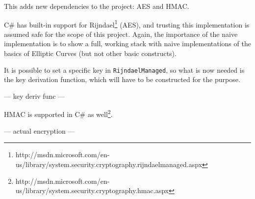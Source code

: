 This adds new dependencies to the project: AES and HMAC.

C\# has built-in support for Rijndael\footnote{http://msdn.microsoft.com/en-us/library/system.security.cryptography.rijndaelmanaged.aspx}
(AES), and trusting this implementation is assumed safe for the scope of this project. Again, the importance of the naive implementation
is to show a full, working stack with naive implementations of the basics of Elliptic Curves (but not other basic constructs).

It is possible to set a specific key in \verb+RijndaelManaged+, so what is now needed is the key derivation function, which will have to
be constructed for the purpose.

--- key deriv func ---

HMAC is supported in C\# as well\footnote{http://msdn.microsoft.com/en-us/library/system.security.cryptography.hmac.aspx}.

--- actual encryption ---